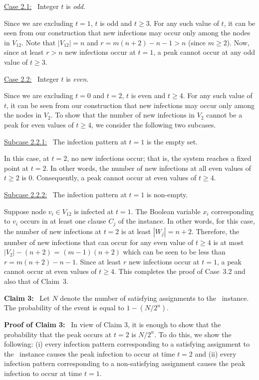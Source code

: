 \noindent
\underline{Case 2.1:}~ Integer $t$ is \emph{odd}. 

Since we are excluding $t = 1$, $t$ is odd and $t \geq 3$.
For any such value of $t$, it can be seen from our construction
that new infections may occur only among the nodes in $V_{12}$. 
Note that $|V_{12}| = n$ and $r = m(n+2)-n-1 > n$ (since $m \geq 2$). 
Now, since at least $r > n$ new infections occur at $t = 1$, 
a peak cannot occur at any odd value of $t \geq 3$.

\noindent
\underline{Case 2.2:}~ Integer $t$ is \emph{even}. 

Since we are excluding $t = 0$ and $t = 2$, 
$t$ is even and $t \geq 4$.
For any such value of $t$, it can be seen from our construction
that new infections may occur only among the nodes in $V_2$. 
To show that the number of new infections in $V_2$ cannot 
be a peak for even values of $t \geq 4$, 
we consider the following two subcases.    

\noindent
\underline{Subcase 2.2.1:}~ The infection pattern at $t = 1$ 
is the empty set.

In this case, at $t = 2$, no new infections occur; 
that is, the system reaches a fixed point at $t = 2$. 
In other words, the number of new infections at all even values 
of $t \geq 2$ is 0.
Consequently, a peak cannot occur at even values of $t \geq 4$.  

\noindent
\underline{Subcase 2.2.2:}~ The infection pattern at $t = 1$ 
is non-empty.

Suppose node $v_i \in V_{12}$ is infected at $t = 1$. 
The Boolean variable $x_i$ corresponding to $v_i$ occurs
in at least one clause $C_j$ of the \mtsat{} instance.
In other words, for this case, the number of new infections at $t = 2$ is
at least $|W_j| = n+2$.
Therefore, the number of new infections that can occur 
for any even value of $t \geq 4$ is at most 
$|V_2| - (n+2)$ = $(m-1)(n+2)$ 
which can be seen to be less than $r = m(n+2)-n-1$.
Since at least $r$ new infections occur at $t = 1$, a peak cannot
occur at even values of $t \geq 4$.
This completes the proof of Case~3.2 and also that of Claim~3.

\medskip
\noindent
\textbf{Claim 3:}~
Let $N$ denote the number of satisfying assignments 
to the~ \mtsat{} instance.
The probability of the event \cale{} is equal to $1-(N/2^n)$.

\noindent
\textbf{Proof of Claim 3:}~ 
In view of Claim 3, it is enough to show that the probability that 
the peak occurs at $t = 2$ is $N/2^n$.
To do this, we show the following: (i) every infection pattern corresponding to
a satisfying assignment to the~ \mtsat{} instance causes
the peak infection to occur at time $t = 2$ and (ii)
every infection pattern corresponding to
a non-satisfying assignment causes the peak infection to
occur at time $t = 1$. 

